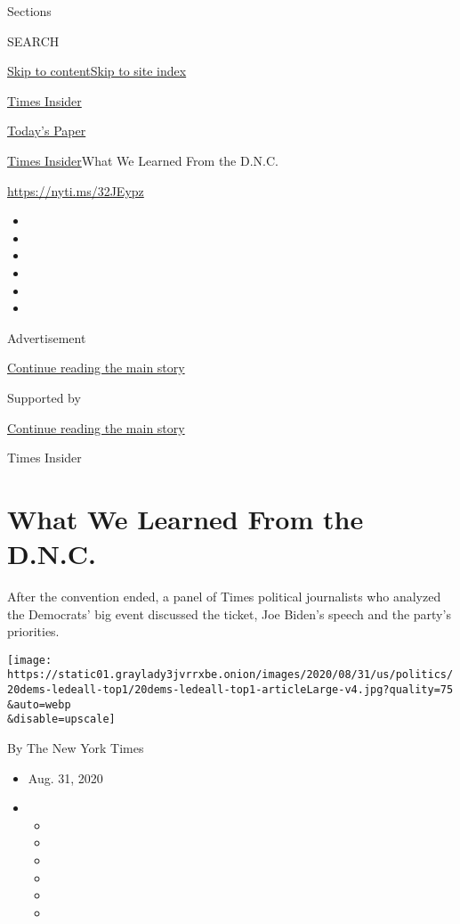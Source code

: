 Sections

SEARCH

\protect\hyperlink{site-content}{Skip to
content}\protect\hyperlink{site-index}{Skip to site index}

\href{https://www.nytimes3xbfgragh.onion/section/reader-center}{Times
Insider}

\href{https://myaccount.nytimes3xbfgragh.onion/auth/login?response_type=cookie\&client_id=vi}{}

\href{https://www.nytimes3xbfgragh.onion/section/todayspaper}{Today's
Paper}

\href{/section/reader-center}{Times Insider}\textbar{}What We Learned
From the D.N.C.

\url{https://nyti.ms/32JEypz}

\begin{itemize}
\item
\item
\item
\item
\item
\item
\end{itemize}

Advertisement

\protect\hyperlink{after-top}{Continue reading the main story}

Supported by

\protect\hyperlink{after-sponsor}{Continue reading the main story}

Times Insider

\hypertarget{what-we-learned-from-the-dnc}{%
\section{What We Learned From the
D.N.C.}\label{what-we-learned-from-the-dnc}}

After the convention ended, a panel of Times political journalists who
analyzed the Democrats' big event discussed the ticket, Joe Biden's
speech and the party's priorities.

\texttt{[image: https://static01.graylady3jvrrxbe.onion/images/2020/08/31/us/politics/20dems-ledeall-top1/20dems-ledeall-top1-articleLarge-v4.jpg?quality=75\\\&auto=webp\\\&disable=upscale]}

By The New York Times

\begin{itemize}
\item
  Aug. 31, 2020
\item
  \begin{itemize}
  \item
  \item
  \item
  \item
  \item
  \item
  \end{itemize}
\end{itemize}

